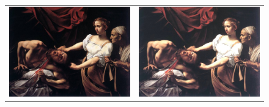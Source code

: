 \newpage

\begin{landscape}
	\begin{figure}[!h]
		\centering
		\begin{tabular}{cc}
			\includegraphics[width=12cm]{Imagenes/caravaggio.jpeg} & 
			\includegraphics[width=12cm]{Imagenes/Contraste_ambos.png} \\

\end{tabular}
\end{figure}
\end{landscape}
